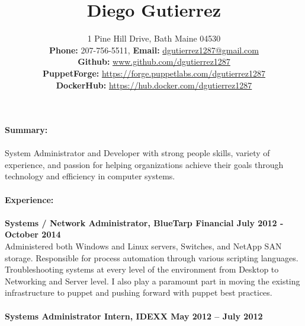 \documentclass[10pt]{article}
\title{Diego Gutierrez}
\date{}
\author{%
	1 Pine Hill Drive, Bath Maine 04530\\
	\textbf{Phone:} 207-756-5511, \textbf{Email:} \underline{dgutierrez1287@gmail.com}\\
	\textbf{Github:} \tab\underline{www.github.com/dgutierrez1287}\\
	\textbf{PuppetForge:} \underline{https://forge.puppetlabs.com/dgutierrez1287}\\
	\textbf{DockerHub:} \space\space\underline{https://hub.docker.com/dgutierrez1287}
}
\makeatletter
\renewcommand{\maketitle}{\bgroup\setlength{\parindent}{0pt}
	\begin{flushleft}
		\LARGE\textbf{\@title}
		
		\normalsize\@author
	\end{flushleft}\egroup
}
\makeatother
\begin{document}
\maketitle
\thispagestyle{empty} %
\noindent\Large\textbf{Summary:}\\
\\
\normalsize System Administrator and Developer with strong people skills, variety of experience, and passion for helping organizations achieve their goals through technology and efficiency in computer systems.
\\
\\
\noindent\Large\textbf{Experience:}\\
\\
\normalsize 
\textbf{Systems / Network Administrator, BlueTarp Financial \hfill{July 2012 - October 2014}}\\
\normalsize Administered both Windows and Linux servers, Switches, and NetApp SAN storage. Responsible for process automation through various scripting languages. Troubleshooting systems at every level of the environment from Desktop to Networking and Server level. I also play a paramount part in moving the existing infrastructure to puppet and pushing forward with puppet best practices.\\
\\
\textbf{Systems Administrator Intern, IDEXX \hfill{May 2012 – July 2012}}\\
\end{document}
